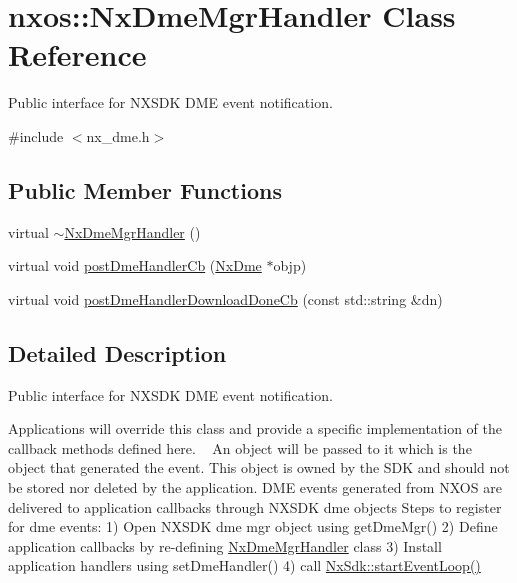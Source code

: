 \hypertarget{classnxos_1_1_nx_dme_mgr_handler}{}\section{nxos\+:\+:Nx\+Dme\+Mgr\+Handler Class Reference}
\label{classnxos_1_1_nx_dme_mgr_handler}


Public interface for N\+X\+S\+DK D\+ME event notification.  




{\ttfamily \#include $<$nx\+\_\+dme.\+h$>$}

\subsection*{Public Member Functions}
\begin{DoxyCompactItemize}
\item 
virtual \mbox{\hyperlink{classnxos_1_1_nx_dme_mgr_handler_a13573474862c7d25f3594fe2e9ab03cd}{$\sim$\+Nx\+Dme\+Mgr\+Handler}} ()
\item 
virtual void \mbox{\hyperlink{classnxos_1_1_nx_dme_mgr_handler_a26838519d4f1d17c2036feb036a0e892}{post\+Dme\+Handler\+Cb}} (\mbox{\hyperlink{classnxos_1_1_nx_dme}{Nx\+Dme}} $\ast$objp)
\item 
virtual void \mbox{\hyperlink{classnxos_1_1_nx_dme_mgr_handler_a785b584b966bb8212c22e506ff568236}{post\+Dme\+Handler\+Download\+Done\+Cb}} (const std\+::string \&dn)
\end{DoxyCompactItemize}


\subsection{Detailed Description}
Public interface for N\+X\+S\+DK D\+ME event notification. 

Applications will override this class and provide a specific implementation of the callback methods defined here. ~\newline
 An object will be passed to it which is the object that generated the event. This object is owned by the S\+DK and should not be stored nor deleted by the application. D\+ME events generated from N\+X\+OS are delivered to application callbacks through N\+X\+S\+DK dme objects Steps to register for dme events\+: 1) Open N\+X\+S\+DK dme mgr object using get\+Dme\+Mgr() 2) Define application callbacks by re-\/defining \mbox{\hyperlink{classnxos_1_1_nx_dme_mgr_handler}{Nx\+Dme\+Mgr\+Handler}} class 3) Install application handlers using set\+Dme\+Handler() 4) call \mbox{\hyperlink{classnxos_1_1_nx_sdk_a75ca70643fe325ddf0eea62c1f8c4cc8}{Nx\+Sdk\+::start\+Event\+Loop()}} 

